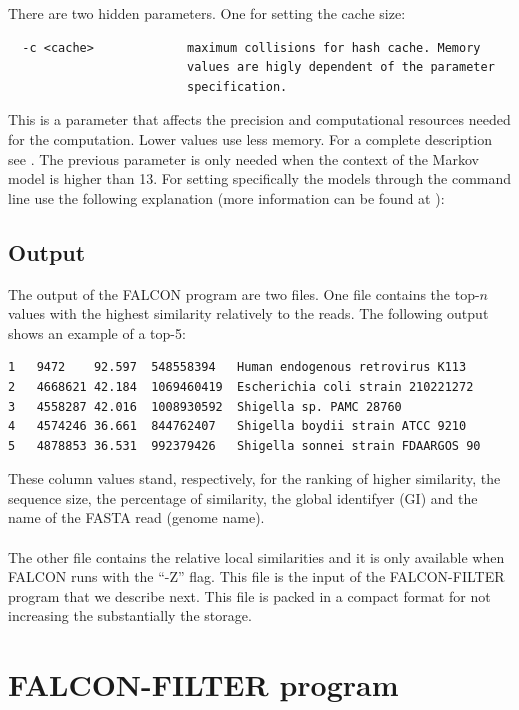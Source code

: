 \documentclass[11pt,journal,compsoc]{report}[1]
\begin{document}
There are two hidden parameters. One for setting the cache size:
\begin{lstlisting}
  -c <cache>             maximum collisions for hash cache. Memory     
                         values are higly dependent of the parameter   
                         specification.                                
\end{lstlisting}
This is a parameter that affects the precision and computational resources
needed for the computation. Lower values use less memory. For a complete
description see \cite{Pratas-2016a,Pratas-2016b}.
The previous parameter is only needed when the context of the Markov model
is higher than 13. For setting specifically the models through the command
line use the following explanation (more information can be found at 
\cite{Pratas-2016a,Pratas-2016b}):

\subsection*{Output}

The output of the FALCON program are two files. One file contains the top-$n$ 
values with the highest similarity relatively to the reads. The following 
output shows an example of a top-5:
\begin{lstlisting}
1	9472	92.597	548558394	Human endogenous retrovirus K113
2	4668621	42.184	1069460419	Escherichia coli strain 210221272
3	4558287	42.016	1008930592	Shigella sp. PAMC 28760
4	4574246	36.661	844762407	Shigella boydii strain ATCC 9210
5	4878853	36.531	992379426	Shigella sonnei strain FDAARGOS 90
\end{lstlisting} 
These column values stand, respectively, for the ranking of higher similarity, 
the sequence size, the percentage of similarity, the global identifyer (GI) and
the name of the FASTA read (genome name).\\
~\\
The other file contains the relative local similarities and it is only 
available when FALCON runs with the ``-Z'' flag. This file is the input of
the FALCON-FILTER program that we describe next. This file is packed in 
a compact format for not increasing the substantially the storage.

\section*{FALCON-FILTER program}
\end{document}
